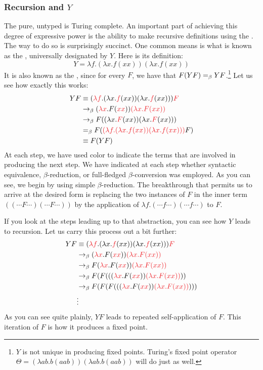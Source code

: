 \subsubsection{Recursion and $Y$}\label{untyped:y}
The pure, untyped \lambdacalc is Turing complete. An important part of achieving this degree of expressive power is the ability to make recursive definitions using the \lambdacalc{}. The way to do so is surprisingly succinct. One common means is what is known as the , universally designated by $Y$. Here is its definition:
\[
Y = \lambda f. (\lambda x.f(xx))(\lambda x.f(xx))
\]
It is also known as the , since for every $F$, we have that $F(YF) =_{\beta} YF$.\footnote{$Y$ is not unique in producing fixed points. Turing's fixed point operator $\Theta = (\lambda a b . b (aab)) (\lambda a b . b (aab))$ will do just as well.} Let us see how exactly this works:
\begin{align*}
Y F &\equiv (\redex{\lambda f}. (\lambda x.\redex{f}(xx))(\lambda x.\redex{f}(xx))) \redex{F} \\
&\betared (\redex{\lambda x}. F(\redex{x}\redex{x})) \redex{(\lambda x. F(xx))}\\
&\betared F ( (\lambda x. \redex{F}(xx)) (\lambda x. \redex{F}(xx)) )\\
&\betacon F (\redex{(\lambda f. (\lambda x.f(xx))(\lambda x.f(xx)))} F)\\
&\equiv F (Y F)
\end{align*}
At each step, we have used color to indicate the terms that are involved in producing the next step. We have indicated at each step whether syntactic equivalence, $\beta$-reduction, or full-fledged $\beta$-conversion was employed. As you can see, we begin by using simple $\beta$-reduction. The breakthrough that permits us to arrive at the desired form is replacing the two instances of $F$ in the inner term $((\dotsb F \dotsb)(\dotsb F \dotsb))$ by the application of $\lambda f. (\dotsb f \dotsb)(\dotsb f \dotsb)$ to $F$.

If you look at the steps leading up to that abstraction, you can see how $Y$ leads to recursion. Let us carry this process out a bit further:
\begin{align*}
Y F &\equiv (\redex{\lambda f}. (\lambda x.\redex{f}(xx))(\lambda x.\redex{f}(xx))) \redex{F} \\
&\betared (\redex{\lambda x}. F(\redex{x}\redex{x})) \redex{(\lambda x. F(xx))}\\
&\betared F (\redex{\lambda x}. F(\redex{x}\redex{x})) \redex{(\lambda x. F(xx))}\\
&\betared F ( F ( ((\redex{\lambda x}. F(\redex{x}\redex{x})) \redex{(\lambda x. F(xx))} ))\\
&\betared F ( F ( F ( ((\redex{\lambda x}. F(\redex{x}\redex{x})) \redex{(\lambda x. F(xx))} )))\\
&\vdots
\end{align*}
As you can see quite plainly, $YF$ leads to repeated self-application of $F$. This iteration of $F$ is how it produces a fixed point.%

